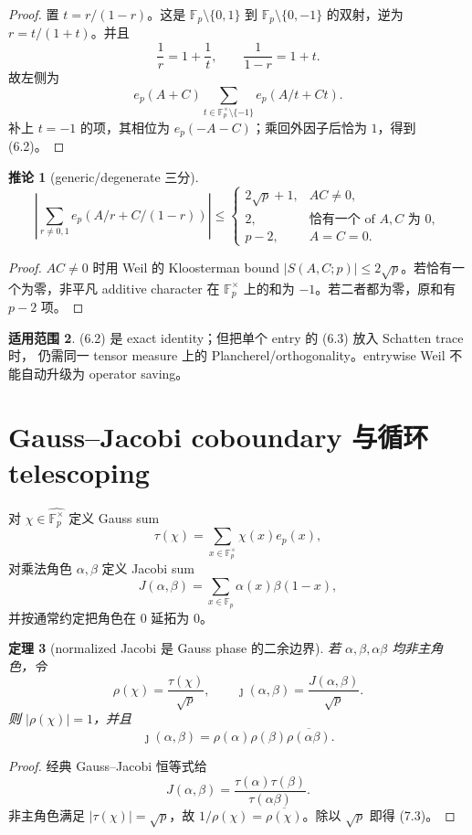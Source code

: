 \documentclass[11pt,a4paper]{ctexart}
\newtheorem{theorem}{定理}[section]
\newtheorem{corollary}[theorem]{推论}
\theoremstyle{definition}
\newtheorem{remark}[theorem]{适用范围}
\newcommand{\F}{\mathbb F}
\newcommand{\G}{\F_p^\times}
\newcommand{\Gh}{\widehat{\G}}
\newcommand{\ep}{e_p}
\newcommand{\1}{\mathbf 1}
\begin{document}
\begin{proof}
置 $t=r/(1-r)$。这是
$\F_p\setminus\{0,1\}$ 到 $\F_p\setminus\{0,-1\}$ 的双射，逆为
$r=t/(1+t)$。并且
\[
\frac1r=1+\frac1t,\qquad \frac1{1-r}=1+t.
\]
故左侧为
\[
\ep(A+C)\sum_{t\in\G\setminus\{-1\}}\ep(A/t+Ct).
\]
补上 $t=-1$ 的项，其相位为 $\ep(-A-C)$；乘回外因子后恰为 $1$，得到 (6.2)。
\end{proof}

\begin{corollary}[generic/degenerate 三分]
\[
\left|\sum_{r\ne0,1}\ep(A/r+C/(1-r))\right|
\le
\begin{cases}
2\sqrt p+1,&AC\ne0,\\
2,&\text{恰有一个 of }A,C\text{ 为 }0,\\
p-2,&A=C=0.
\end{cases}
\tag{6.3}
\]
\end{corollary}

\begin{proof}
$AC\ne0$ 时用 Weil 的 Kloosterman bound
$|S(A,C;p)|\le2\sqrt p$。若恰有一个为零，非平凡 additive character
在 $\G$ 上的和为 $-1$。若二者都为零，原和有 $p-2$ 项。
\end{proof}

\begin{remark}
(6.2) 是 exact identity；但把单个 entry 的 (6.3) 放入 Schatten trace 时，
仍需同一 tensor measure 上的 Plancherel/orthogonality。entrywise Weil
不能自动升级为 operator saving。
\end{remark}

\section{Gauss--Jacobi coboundary 与循环 telescoping}

对 $\chi\in\Gh$ 定义 Gauss sum
\[
\tau(\chi)=\sum_{x\in\G}\chi(x)\ep(x),
\tag{7.1}
\]
对乘法角色 $\alpha,\beta$ 定义 Jacobi sum
\[
J(\alpha,\beta)=\sum_{x\in\F_p}\alpha(x)\beta(1-x),
\tag{7.2}
\]
并按通常约定把角色在 $0$ 延拓为 $0$。

\begin{theorem}[normalized Jacobi 是 Gauss phase 的二余边界]
若 $\alpha,\beta,\alpha\beta$ 均非主角色，令
\[
\rho(\chi)=\frac{\tau(\chi)}{\sqrt p},
\qquad
\jmath(\alpha,\beta)=\frac{J(\alpha,\beta)}{\sqrt p}.
\]
则 $|\rho(\chi)|=1$，并且
\[
\boxed{
\jmath(\alpha,\beta)
=\rho(\alpha)\rho(\beta)\overline{\rho(\alpha\beta)}.}
\tag{7.3}
\]
\end{theorem}

\begin{proof}
经典 Gauss--Jacobi 恒等式给
\[
J(\alpha,\beta)=\frac{\tau(\alpha)\tau(\beta)}{\tau(\alpha\beta)}.
\]
非主角色满足 $|\tau(\chi)|=\sqrt p$，故
$1/\rho(\chi)=\overline{\rho(\chi)}$。除以 $\sqrt p$ 即得 (7.3)。
\end{proof}
\end{document}
